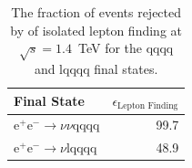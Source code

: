 \begin{table}[h!]
\centering
\begin{tabular}{ l r }
\hline
Final State & $\epsilon_{\text{Lepton Finding}}$ \\ 
\hline
$\text{e}^{+}\text{e}^{-} \rightarrow \nu{\nu}\text{qqqq}$ & 99.7 \\
$\text{e}^{+}\text{e}^{-} \rightarrow \nu\text{lqqqq}$ & 48.9 \\
\hline
\end{tabular}
\caption[The fraction of events rejected by of isolated lepton finding at $\sqrt{s}=1.4$~TeV for the {\nu}{\nu}qqqq and l{\nu}qqqq final states.]{The fraction of events rejected by of isolated lepton finding at $\sqrt{s}=1.4$~TeV for the {\nu}{\nu}qqqq and l{\nu}qqqq final states.}
\label{table:efficiencyleptonfinding}
\end{table}


